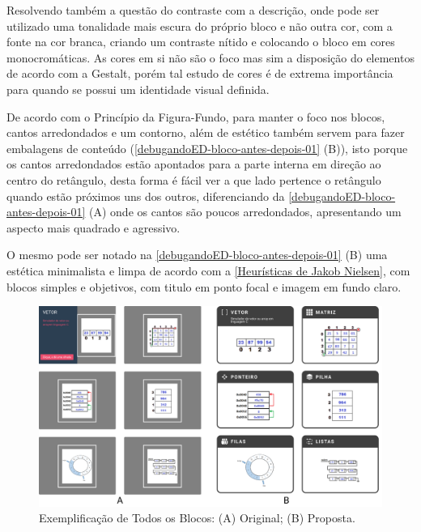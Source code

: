 Resolvendo também a questão do contraste com a descrição, onde pode ser utilizado uma tonalidade mais escura do próprio bloco e não outra cor, com a fonte na cor branca, criando um contraste nítido e colocando o bloco em cores monocromáticas. As cores em si não são o foco mas sim a disposição do elementos de acordo com a Gestalt, porém tal estudo de cores é de extrema importância para quando se possui um identidade visual definida.

De acordo com o Princípio da Figura-Fundo, para manter o foco nos blocos, cantos arredondados e um contorno, além de estético também servem para fazer embalagens de conteúdo (\autoref{debugandoED-bloco-antes-depois-01} (B)), isto porque os cantos arredondados estão apontados para a parte interna em direção ao centro do retângulo, desta forma é fácil ver a que lado pertence o retângulo quando estão próximos uns dos outros, diferenciando da \autoref{debugandoED-bloco-antes-depois-01} (A) onde os cantos são poucos arredondados, apresentando um aspecto mais quadrado e agressivo.

O mesmo pode ser notado na \autoref{debugandoED-bloco-antes-depois-01} (B) uma estética minimalista e limpa de acordo com a \autoref{Heurísticas de Jakob Nielsen}, com blocos simples e objetivos, com titulo em ponto focal e imagem em fundo claro.

\begin{figure}[htb]
    \begin{center}
	    \includegraphics[scale=0.25]{figs/debugandoED-bloco-antes-depois-01.png}
	\end{center}
    \caption{\label{debugandoED-bloco-antes-depois-01}Exemplificação de Todos os Blocos: (A) Original; (B) Proposta.}
\end{figure}


